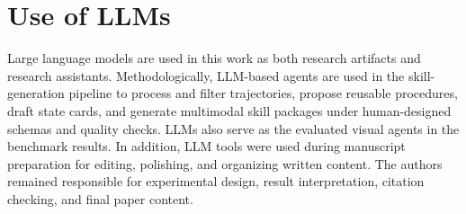 \section{Use of LLMs}
\label{app:use-of-llms}

Large language models are used in this work as both research artifacts and research assistants. Methodologically, LLM-based agents are used in the skill-generation pipeline to process and filter trajectories, propose reusable procedures, draft state cards, and generate multimodal skill packages under human-designed schemas and quality checks. LLMs also serve as the evaluated visual agents in the benchmark results. In addition, LLM tools were used during manuscript preparation for editing, polishing, and organizing written content. The authors remained responsible for experimental design, result interpretation, citation checking, and final paper content.

\clearpage

